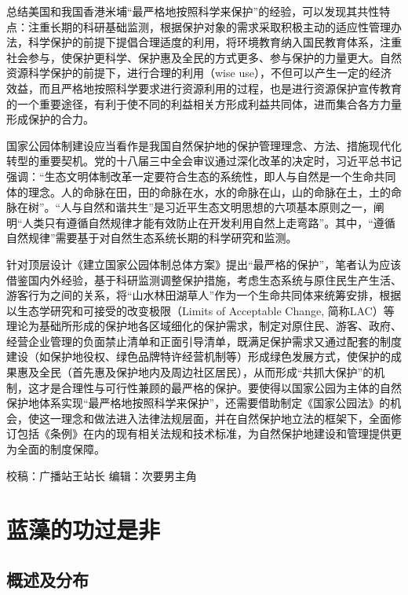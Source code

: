 \documentclass[
]{book}
\begin{document}
总结美国和我国香港米埔``最严格地按照科学来保护''的经验，可以发现其共性特点：注重长期的科研基础监测，根据保护对象的需求采取积极主动的适应性管理办法，科学保护的前提下提倡合理适度的利用，将环境教育纳入国民教育体系，注重社会参与，使保护更科学、保护惠及全民的方式更多、参与保护的力量更大。自然资源科学保护的前提下，进行合理的利用（wise use），不但可以产生一定的经济效益，而且严格地按照科学要求进行资源利用的过程，也是进行资源保护宣传教育的一个重要途径，有利于使不同的利益相关方形成利益共同体，进而集合各方力量形成保护的合力。

国家公园体制建设应当看作是我国自然保护地的保护管理理念、方法、措施现代化转型的重要契机。党的十八届三中全会审议通过深化改革的决定时，习近平总书记强调：``生态文明体制改革一定要符合生态的系统性，即人与自然是一个生命共同体的理念。人的命脉在田，田的命脉在水，水的命脉在山，山的命脉在土，土的命脉在树''。``人与自然和谐共生''是习近平生态文明思想的六项基本原则之一，阐明``人类只有遵循自然规律才能有效防止在开发利用自然上走弯路''。其中，``遵循自然规律''需要基于对自然生态系统长期的科学研究和监测。

针对顶层设计《建立国家公园体制总体方案》提出``最严格的保护''，笔者认为应该借鉴国内外经验，基于科研监测调整保护措施，考虑生态系统与原住民生产生活、游客行为之间的关系，将``山水林田湖草人''作为一个生命共同体来统筹安排，根据以生态学研究和可接受的改变极限（Limits of Acceptable Change, 简称LAC）等理论为基础所形成的保护地各区域细化的保护需求，制定对原住民、游客、政府、经营企业管理的负面禁止清单和正面引导清单，既满足保护需求又通过配套的制度建设（如保护地役权、绿色品牌特许经营机制等）形成绿色发展方式，使保护的成果惠及全民（首先惠及保护地内及周边社区居民），从而形成``共抓大保护''的机制，这才是合理性与可行性兼顾的最严格的保护。要使得以国家公园为主体的自然保护地体系实现``最严格地按照科学来保护''，还需要借助制定《国家公园法》的机会，使这一理念和做法进入法律法规层面，并在自然保护地立法的框架下，全面修订包括《条例》在内的现有相关法规和技术标准，为自然保护地建设和管理提供更为全面的制度保障。

校稿：广播站王站长
编辑：次要男主角

\hypertarget{ux84ddux85fbux7684ux529fux8fc7ux662fux975e}{%
\section{蓝藻的功过是非}\label{ux84ddux85fbux7684ux529fux8fc7ux662fux975e}}

\hypertarget{ux6982ux8ff0ux53caux5206ux5e03}{%
\subsection{概述及分布}\label{ux6982ux8ff0ux53caux5206ux5e03}}
\end{document}
